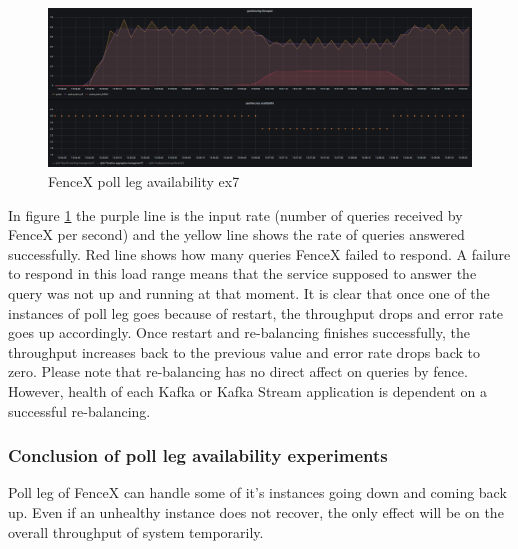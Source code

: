 \documentclass[a4]{report}
\begin{document}
    \begin{figure}[h!]
        \centering
        \caption{FenceX poll leg availability ex7}
        \label{fig:ex7}
        \includegraphics[width=\linewidth, scale=2]{images/evaluation/ex7-benchmarking-ongoing-2per10sec.png}
    \end{figure}

    In figure \ref{fig:ex7} the purple line is the input rate (number of queries received by FenceX per
    second) and the yellow line shows the rate of queries answered successfully.
    Red line shows how many queries FenceX failed to respond.
    A failure to respond in this load range means that the service supposed to answer the query was not
    up and running at that moment.
    It is clear that once one of the instances of poll leg goes because of restart, the throughput drops and error
    rate goes up accordingly.
    Once restart and re-balancing finishes successfully, the throughput increases back to the previous
    value and error rate drops back to zero.
    Please note that re-balancing has no direct affect on queries by fence.
    However, health of each Kafka or Kafka Stream application is dependent on a successful re-balancing.

    \subsubsection{Conclusion of poll leg availability experiments}
    Poll leg of FenceX can handle some of it's instances going down and coming back up.
    Even if an unhealthy instance does not recover, the only effect will be on the overall throughput of system
    temporarily.
\end{document}
